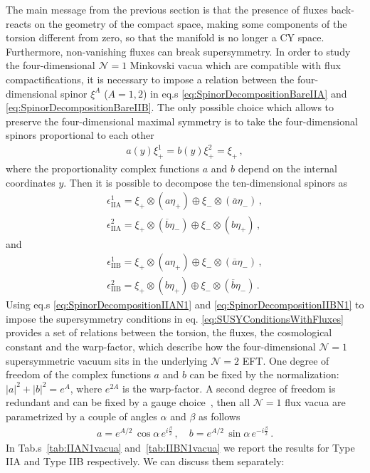 \documentclass[12pt,a4paper]{book}
\begin{document}
The main message from the previous section is that the presence of fluxes back-reacts on the geometry of the compact space, making some components of the torsion different from zero, so that the manifold is no longer a CY space. Furthermore, non-vanishing fluxes can break supersymmetry. In order to study the four-dimensional $\mathcal{N} = 1$ Minkovski vacua which are compatible with flux compactifications, it is necessary to impose a relation between the four-dimensional spinor $\xi^{A}$ ($A = 1, 2$) in eq.s \eqref{eq:SpinorDecompositionBareIIA} and \eqref{eq:SpinorDecompositionBareIIB}. The only possible choice which allows to preserve the four-dimensional maximal symmetry is to take the four-dimensional spinors proportional to each other \cite{Grana:2005jc}
\begin{align}
\label{eq:SpinorProportionality}
a(y) \xi_+^1 = b(y) \xi_+^2 = \xi_+ \,,
\end{align}
where the proportionality complex functions $a$ and $b$ depend on the internal coordinates $y$. Then it is possible to decompose the ten-dimensional spinors as
\begin{align}
\label{eq:SpinorDecompositionIIAN1}
\epsilon^1_{\text{IIA}} = \xi_+ \otimes \left(a \eta_+\right) \oplus \xi_- \otimes \left(\overline{a}\eta_-\right) \,, \nonumber \\
\epsilon^2_{\text{IIA}} = \xi_+ \otimes \left(\overline{b}\eta_-\right) \oplus \xi_- \otimes \left(b \eta_+\right)\,,
\end{align}
and
\begin{align}
\label{eq:SpinorDecompositionIIBN1}
\epsilon^1_{\text{IIB}} = \xi_+ \otimes \left(a \eta_+\right) \oplus \xi_- \otimes \left(\overline{a}\eta_-\right) \,, \nonumber \\
\epsilon^2_{\text{IIB}} = \xi_+ \otimes \left(b \eta_+\right) \oplus \xi_- \otimes \left(\overline{b} \eta_-\right)\,.
\end{align}
Using eq.s \eqref{eq:SpinorDecompositionIIAN1} and \eqref{eq:SpinorDecompositionIIBN1} to impose the supersymmetry conditions in eq. \eqref{eq:SUSYConditionsWithFluxes} provides a set of relations between the torsion, the fluxes, the cosmological constant and the warp-factor, which describe how the four-dimensional $\mathcal{N} = 1$ supersymmetric vacuum sits in the underlying $\mathcal{N} = 2$ EFT. One degree of freedom of the complex functions $a$ and $b$ can be fixed by the normalization: $|a|^2 + |b|^2 = e^A$, where $e^{2 A}$ is the warp-factor. A second degree of freedom is redundant and can be fixed by a gauge choice~\cite{Grana:2005jc, Grana:2005sn}, then all $\mathcal{N} = 1$ flux vacua are parametrized by a couple of angles $\alpha$ and $\beta$ as follows
\begin{align}
\label{eq:VacuaParameterization}
a = e^{A/2} \, \cos \alpha \, e^{i \frac{\beta}{2}}\,, \quad b = e^{A/2} \, \sin \alpha \, e^{-i \frac{\beta}{2}} \,.
\end{align}
In Tab.s~\ref{tab:IIAN1vacua} and~\ref{tab:IIBN1vacua} we report the results for Type IIA and Type IIB respectively. We can discuss them separately:
\end{document}
